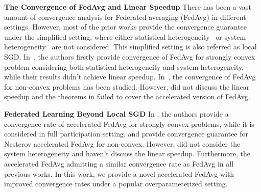 \textbf{The Convergence of FedAvg and Linear Speedup}
There has been a vast amount of convergence analysis for Federated averaging
(FedAvg) in different settings. However, most of the prior works provide the
convergence guarantee under the simplified setting, where either statistical
heterogeneity~\cite{stich2018local,zhou2017convergence,wang2018cooperative,woodworth2018graph} or system
heterogeneity~\cite{yu2019parallel,wang2019adaptive,khaled2019first,jiang2018linear} are not
considered. This simplified setting is also referred as local SGD. 
In~\cite{li2019convergence},
the authors firstly provide convergence of FedAvg for strongly convex problem considering both statistical heterogeneity and system heterogeneity, while their results
didn't achieve linear speedup. In~\cite{haddadpour2019convergence,liang2019variance,huo2020faster,jiang2018linear}, the convergence of FedAvg for non-convex problems has been studied. 
However, \cite{huo2020faster} did not discuss the linear speedup and the theorems in \cite{haddadpour2019convergence,liang2019variance} failed to cover the accelerated version of
FedAvg. 


\textbf{Federated Learning Beyond Local SGD}
In \cite{liu2019accelerating}, the authors provide a convergence rate of accelerated FedAvg for strongly convex problems, while it is considered in full participation setting.
\cite{yu2019linear} and \citep{huo2020faster} provide
convergence guarantee for Nesterov accelerated FedAvg for non-convex. 
However, \cite{yu2019linear} did not consider the system heterogeneity and \cite{huo2020faster} haven't discuss the linear speedup.
Furthermore, the accelerated FedAvg admitting a similar convergence rate as FedAvg in all previous works.  In this work, we provide a novel accelerated FedAvg with improved convergence rates under a popular overparameterized setting. 






